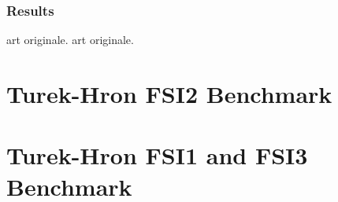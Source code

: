 \subsubsection{Results}

\cite{ramm1998fluid} art originale.
\cite{ramm1998fluid} art originale.
\cite{walhorn2002space}
\cite{matthies2003partitioned}
\cite{dettmer2006computational}
\cite{olivier2009fluid}
\cite{wood2010partitioned}
\cite{kassiotis2011nonlinear}
\cite{habchi2013partitioned}
\cite{froehle2014high}






















\section{Turek-Hron FSI2 Benchmark}

\cite{turek2006proposal}
























\section{Turek-Hron FSI1 and FSI3 Benchmark}

\cite{turek2006proposal}



























